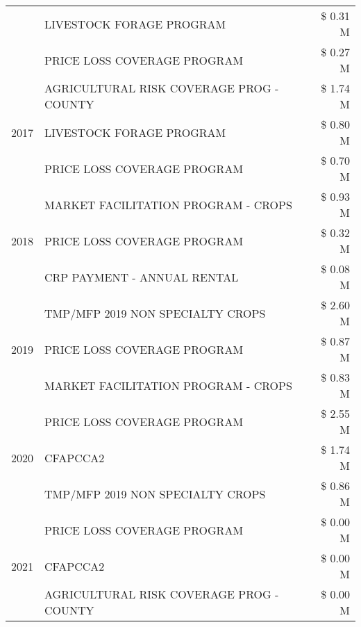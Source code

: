 \begin{tabular}{llr}
 & LIVESTOCK FORAGE PROGRAM                      & \$ 0.31 M \\
 & PRICE LOSS COVERAGE PROGRAM                   & \$ 0.27 M \\
\cline{1-3}
\multirow[t]{3}{*}{2017} & AGRICULTURAL RISK COVERAGE PROG - COUNTY & \$ 1.74 M \\
 & LIVESTOCK FORAGE PROGRAM & \$ 0.80 M \\
 & PRICE LOSS COVERAGE PROGRAM & \$ 0.70 M \\
\cline{1-3}
\multirow[t]{3}{*}{2018} & MARKET FACILITATION PROGRAM - CROPS & \$ 0.93 M \\
 & PRICE LOSS COVERAGE PROGRAM & \$ 0.32 M \\
 & CRP PAYMENT - ANNUAL RENTAL & \$ 0.08 M \\
\cline{1-3}
\multirow[t]{3}{*}{2019} & TMP/MFP 2019 NON SPECIALTY CROPS & \$ 2.60 M \\
 & PRICE LOSS COVERAGE PROGRAM & \$ 0.87 M \\
 & MARKET FACILITATION PROGRAM - CROPS & \$ 0.83 M \\
\cline{1-3}
\multirow[t]{3}{*}{2020} & PRICE LOSS COVERAGE PROGRAM & \$ 2.55 M \\
 & CFAPCCA2 & \$ 1.74 M \\
 & TMP/MFP 2019 NON SPECIALTY CROPS & \$ 0.86 M \\
\cline{1-3}
\multirow[t]{3}{*}{2021} & PRICE LOSS COVERAGE PROGRAM & \$ 0.00 M \\
 & CFAPCCA2 & \$ 0.00 M \\
 & AGRICULTURAL RISK COVERAGE PROG - COUNTY & \$ 0.00 M \\
\cline{1-3}
\bottomrule
\end{tabular}
